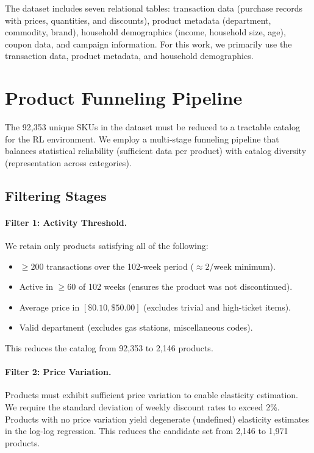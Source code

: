 \documentclass[11pt,a4paper]{article}
\begin{document}
The dataset includes seven relational tables: transaction data (purchase records with prices, quantities, and discounts), product metadata (department, commodity, brand), household demographics (income, household size, age), coupon data, and campaign information.
For this work, we primarily use the transaction data, product metadata, and household demographics.

\section{Product Funneling Pipeline}
\label{sec:funneling}

The 92,353 unique SKUs in the dataset must be reduced to a tractable catalog for the RL environment.
We employ a multi-stage funneling pipeline that balances statistical reliability (sufficient data per product) with catalog diversity (representation across categories).

\subsection{Filtering Stages}

\paragraph{Filter 1: Activity Threshold.}
We retain only products satisfying all of the following:
\begin{itemize}
    \item $\geq 200$ transactions over the 102-week period ($\approx 2$/week minimum).
    \item Active in $\geq 60$ of 102 weeks (ensures the product was not discontinued).
    \item Average price in $[\$0.10, \$50.00]$ (excludes trivial and high-ticket items).
    \item Valid department (excludes gas stations, miscellaneous codes).
\end{itemize}
This reduces the catalog from 92,353 to 2,146 products.

\paragraph{Filter 2: Price Variation.}
Products must exhibit sufficient price variation to enable elasticity estimation.
We require the standard deviation of weekly discount rates to exceed 2\%.
Products with no price variation yield degenerate (undefined) elasticity estimates in the log-log regression.
This reduces the candidate set from 2,146 to 1,971 products.
\end{document}

